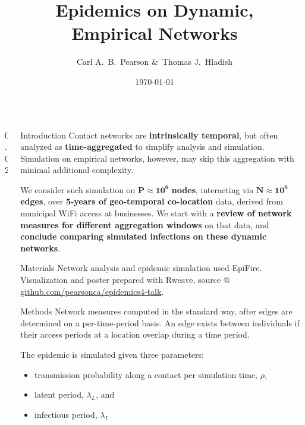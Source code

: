 \documentclass[final]{beamer} %
\title[Epi. on Emp. Nets]{Epidemics on Dynamic,\\ Empirical Networks}
\author[Pearson \& Hladish]{Carl A.~B.~Pearson \&\ Thomas J.~Hladish}
\institute[EPI-UF]{Emerging Pathogens Institute, University of Florida}
\date{\today}
\newcommand{\spaceProp}{0.02}
\newcommand{\spacer}{\begin{column}{\spaceProp\paperwidth}\end{column}}
\newenvironment{oneCol}{\begin{column}[t]{0.225\paperwidth}}{\end{column}}
\begin{document}

  \begin{frame}{}
    \begin{columns}[t]
    \spacer{}
    \begin{oneCol}
    \begin{block}{Introduction}
Contact networks are \textbf{intrinsically temporal}, but often analyzed as \textbf{time-aggregated} to simplify analysis and simulation.  Simulation on empirical networks, however, may skip this aggregation with minimal additional complexity.

We consider such simulation on $\mathbf{P\approx 10^6}$\textbf{ nodes}, interacting via $\mathbf{N\approx 10^6}$\textbf{ edges}, over \textbf{5-years of geo-temporal co-location} data, derived from municipal WiFi access at businesses.  We start with a \textbf{review of network measures for different aggregation windows} on that data, and \textbf{conclude comparing simulated infections on these dynamic networks}.
    \end{block}
    \begin{block}{Materials}
Network analysis and epidemic simulation used EpiFire\cite{hladish2012epifire}.  Visualization and poster prepared with Rweave, source @ \href{https://github.com/pearsonca/epidemics4-talk}{github.com/pearsonca/epidemics4-talk}.
    \end{block}
    \begin{block}{Methods}
Network measures computed in the standard way, after edges are determined on a per-time-period basis.  An edge exists between individuals if their access periods at a location overlap during a time period.

The epidemic is simulated given three parameters:\begin{itemize}
\item transmission probability along a contact per simulation time, $\rho$,
\item latent period, $\lambda_L$, and
\item infectious period, $\lambda_I$
\end{itemize}


\end{block}
\end{oneCol}
\end{columns}
\end{frame}
\end{document}
